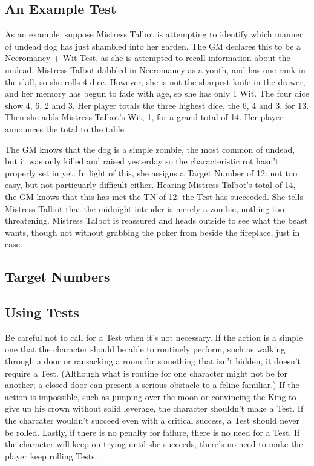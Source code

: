\subsection{An Example Test}

As an example, suppose Mistress Talbot is attempting to identify which manner of undead dog has just shambled into her garden.
The GM declares this to be a Necromancy + Wit Test, as she is attempted to recall information about the undead.
Mistress Talbot dabbled in Necromancy as a youth, and has one rank in the skill, so she rolls 4 dice.
However, she is not the sharpest knife in the drawer, and her memory has begun to fade with age, so she has only 1 Wit.
The four dice show 4, 6, 2 and 3.
Her player totals the three highest dice, the 6, 4 and 3, for 13.
Then she adds Mistress Talbot's Wit, 1, for a grand total of 14.
Her player announces the total to the table.

The GM knows that the dog is a simple zombie, the most common of undead, but it was only killed and raised yesterday so the characteristic rot hasn't properly set in yet.
In light of this, she assigns a Target Number of 12: not too easy, but not particuarly difficult either.
Hearing Mistress Talbot's total of 14, the GM knows that this has met the TN of 12: the Test has succeeded.
She tells Mistress Talbot that the midnight intruder is merely a zombie, nothing too threatening.
Mistress Talbot is reassured and heads outside to see what the beast wants, though not without grabbing the poker from beside the fireplace, just in case.

\subsection{Target Numbers}

\subsection{Using Tests}

Be careful not to call for a Test when it's not necessary.
If the action is a simple one that the character should be able to routinely perform, such as walking through a door or ransacking a room for something that isn't hidden, it doesn't require a Test.
(Although what is routine for one character might not be for another; a closed door can present a serious obstacle to a feline familiar.)
If the action is impossible, such as jumping over the moon or convincing the King to give up his crown without solid leverage, the character shouldn't make a Test.
If the charcater wouldn't succeed even with a critical success, a Test should never be rolled.
Lastly, if there is no penalty for failure, there is no need for a Test.
If the character will keep on trying until she succeeds, there's no need to make the player keep rolling Tests.

